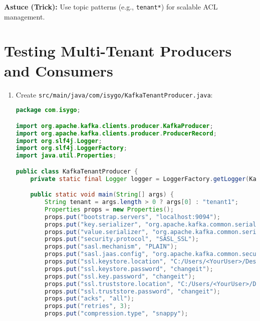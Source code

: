 \documentclass[12pt,a4paper]{report}
\begin{document}
\begin{framed}
\textbf{Astuce (Trick):} Use topic patterns (e.g., \texttt{tenant*}) for scalable ACL management.
\end{framed}

\section{Testing Multi-Tenant Producers and Consumers}
\begin{enumerate}
    \item Create \texttt{src/main/java/com/isygo/KafkaTenantProducer.java}:
\begin{lstlisting}[language=java]
package com.isygo;

import org.apache.kafka.clients.producer.KafkaProducer;
import org.apache.kafka.clients.producer.ProducerRecord;
import org.slf4j.Logger;
import org.slf4j.LoggerFactory;
import java.util.Properties;

public class KafkaTenantProducer {
    private static final Logger logger = LoggerFactory.getLogger(KafkaTenantProducer.class);

    public static void main(String[] args) {
        String tenant = args.length > 0 ? args[0] : "tenant1";
        Properties props = new Properties();
        props.put("bootstrap.servers", "localhost:9094");
        props.put("key.serializer", "org.apache.kafka.common.serialization.StringSerializer");
        props.put("value.serializer", "org.apache.kafka.common.serialization.StringSerializer");
        props.put("security.protocol", "SASL_SSL");
        props.put("sasl.mechanism", "PLAIN");
        props.put("sasl.jaas.config", "org.apache.kafka.common.security.plain.PlainLoginModule required username=\"" + tenant + "\" password=\"" + tenant + "-secret\";");
        props.put("ssl.keystore.location", "C:/Users/<YourUser>/Desktop/w1d1-lab/certs/kafka.keystore.jks");
        props.put("ssl.keystore.password", "changeit");
        props.put("ssl.key.password", "changeit");
        props.put("ssl.truststore.location", "C:/Users/<YourUser>/Desktop/w1d1-lab/certs/kafka.truststore.jks");
        props.put("ssl.truststore.password", "changeit");
        props.put("acks", "all");
        props.put("retries", 3);
        props.put("compression.type", "snappy");


\end{lstlisting}
\end{enumerate}
\end{document}
